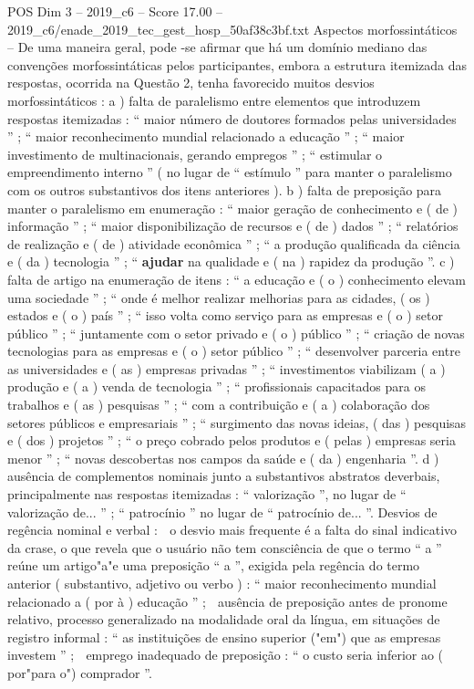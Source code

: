 \begin{textsample}{POS Dim 3 – 2019\_c6 – Score 17.00 – 2019\_c6/enade\_2019\_tec\_gest\_hosp\_50af38c3bf.txt}
Aspectos morfossintáticos – De uma maneira geral, pode -se afirmar que há um domínio mediano das convenções morfossintáticas pelos participantes, embora a estrutura itemizada das respostas, ocorrida na Questão 2, tenha favorecido muitos desvios morfossintáticos : a ) falta de paralelismo entre elementos que introduzem respostas itemizadas : “ maior número de doutores formados pelas universidades ” ; “ maior reconhecimento mundial relacionado a educação ” ; “ maior investimento de multinacionais, gerando empregos ” ; “ estimular o empreendimento interno ” ( no lugar de “ estímulo ” para manter o paralelismo com os outros substantivos dos itens anteriores ). b ) falta de preposição para manter o paralelismo em enumeração : “ maior geração de conhecimento e ( de ) informação ” ; “ maior disponibilização de recursos e ( de ) dados ” ; “ relatórios de realização e ( de ) atividade econômica ” ; “ a produção qualificada da ciência e ( da ) tecnologia ” ; “ \textbf{ajudar} na qualidade e ( na ) rapidez da produção ”. c ) falta de artigo na enumeração de itens : “ a educação e ( o ) conhecimento elevam uma sociedade ” ; “ onde é melhor realizar melhorias para as cidades, ( os ) estados e ( o ) país ” ; “ isso volta como serviço para as empresas e ( o ) setor público ” ; “ juntamente com o setor privado e ( o ) público ” ; “ criação de novas tecnologias para as empresas e ( o ) setor público ” ; “ desenvolver parceria entre as universidades e ( as ) empresas privadas ” ; “ investimentos viabilizam ( a ) produção e ( a ) venda de tecnologia ” ; “ profissionais capacitados para os trabalhos e ( as ) pesquisas ” ; “ com a contribuição e ( a ) colaboração dos setores públicos e empresariais ” ; “ surgimento das novas ideias, ( das ) pesquisas e ( dos ) projetos ” ; “ o preço cobrado pelos produtos e ( pelas ) empresas seria menor ” ; “ novas descobertas nos campos da saúde e ( da ) engenharia ”. d ) ausência de complementos nominais junto a substantivos abstratos deverbais, principalmente nas respostas itemizadas : “ valorização ”, no lugar de “ valorização de... ” ; “ patrocínio ” no lugar de “ patrocínio de... ”.
Desvios de regência nominal e verbal :  o desvio mais frequente é a falta do sinal indicativo da crase, o que revela que o usuário não tem consciência de que o termo “ a ” reúne um artigo"a"e uma preposição “ a ”, exigida pela regência do termo anterior ( substantivo, adjetivo ou verbo ) : “ maior reconhecimento mundial relacionado a ( por à ) educação ” ;  ausência de preposição antes de pronome relativo, processo generalizado na modalidade oral da língua, em situações de registro informal : “ as instituições de ensino superior ("em") que as empresas investem ” ;  emprego inadequado de preposição : “ o custo seria inferior ao ( por"para o") comprador ”.

\end{textsample}
